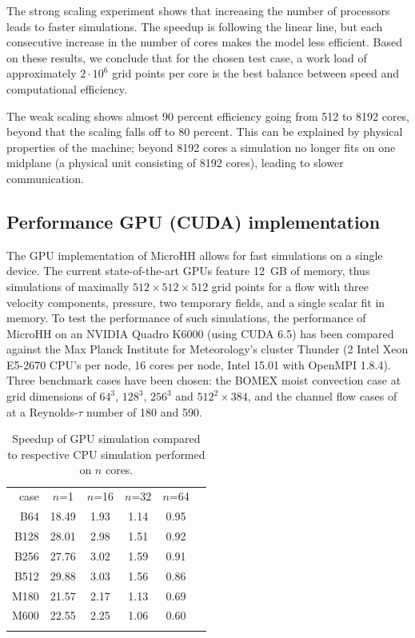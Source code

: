 \documentclass[gmd]{copernicus}
\begin{document}
The strong scaling experiment shows that increasing the number of processors leads to faster simulations. The speedup is following the linear line, but each consecutive increase in the number of cores makes the model less efficient. Based on these results, we conclude that for the chosen test case, a work load of approximately $2\cdot 10^6$ grid points per core is the best balance between speed and computational efficiency.

The weak scaling shows almost 90 percent efficiency going from 512 to 8192 cores, beyond that the scaling falls off to 80 percent. This can be explained by physical properties of the machine;  beyond 8192 cores a simulation no longer fits on one midplane (a physical unit consisting of 8192 cores), leading to slower communication.

\subsection{Performance GPU (CUDA) implementation}
The GPU implementation of MicroHH allows for fast simulations on a single device. The current state-of-the-art GPUs feature 12~GB of memory, thus simulations of maximally $512 \times 512 \times 512$ grid points for a flow with three velocity components, pressure, two temporary fields, and a single scalar fit in memory. To test the performance of such simulations, the performance of MicroHH on an NVIDIA Quadro K6000 (using CUDA 6.5) has been compared against the Max Planck Institute for Meteorology's cluster Thunder (2 Intel Xeon E5-2670 CPU's per node, 16 cores per node, Intel 15.01 with OpenMPI 1.8.4). Three benchmark cases have been chosen: the BOMEX moist convection case at grid dimensions of $64^3$, $128^3$, $256^3$ and $512^2 \times 384$, and the channel flow cases of \citet{Moser1999} at a Reynolds-$\tau$ number of 180 and 590.

\begin{table}[t]
	\caption{Speedup of GPU simulation compared to respective CPU simulation performed on $n$ cores.}\label{tab:gpu}
	\begin{tabular}{rccccc}
		\tophline
		case & $n$=1 & $n$=16 & $n$=32 & $n$=64   \\
		\middlehline
		B64  & 18.49 & 1.93 & 1.14 & 0.95 \\
		B128 & 28.01 & 2.98 & 1.51 & 0.92 \\
		B256 & 27.76 & 3.02 & 1.59 & 0.91 \\
		B512 & 29.88 & 3.03 & 1.56 & 0.86 \\
		\middlehline
		M180 & 21.57 & 2.17 & 1.13 & 0.69 \\
		M600 & 22.55 & 2.25 & 1.06 & 0.60 \\
		\bottomhline
	\end{tabular}
\end{table}
\end{document}
